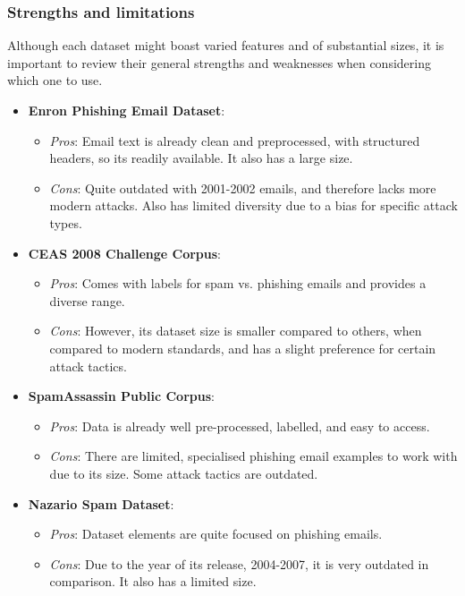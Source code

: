 
\subsubsection*{Strengths and limitations}
Although each dataset might boast varied features and of substantial sizes, it is important to review their general strengths and weaknesses when considering which one to use.

\begin{itemize}
  \item \textbf{Enron Phishing Email Dataset}:
  \begin{itemize}
    \item \textit{Pros}: Email text is already clean and preprocessed, with structured headers, so its readily available. It also has a large size.
    \item \textit{Cons}: Quite outdated with 2001-2002 emails, and therefore lacks more modern attacks. Also has limited diversity due to a bias for specific attack types.
  \end{itemize}
  \item \textbf{CEAS 2008 Challenge Corpus}:
  \begin{itemize}
    \item \textit{Pros}: Comes with labels for spam vs. phishing emails and provides a diverse range.
    \item \textit{Cons}: However, its dataset size is smaller compared to others, when compared to modern standards, and has a slight preference for certain attack tactics.
  \end{itemize}
  \item \textbf{SpamAssassin Public Corpus}:
  \begin{itemize}
    \item \textit{Pros}: Data is already well pre-processed, labelled, and easy to access.
    \item \textit{Cons}: There are limited, specialised phishing email examples to work with due to its size. Some attack tactics are outdated.
  \end{itemize}
  \item \textbf{Nazario Spam Dataset}:
  \begin{itemize}
    \item \textit{Pros}: Dataset elements are quite focused on phishing emails.
    \item \textit{Cons}: Due to the year of its release, 2004-2007, it is very outdated in comparison. It also has a limited size.

\end{itemize}
\end{itemize}
